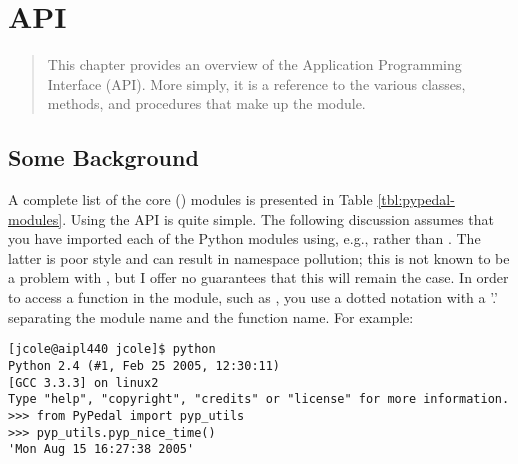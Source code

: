 \chapter{API}
\label{cha:api}
\begin{quote}
This chapter provides an overview of the \PYPEDAL{} Application Programming Interface (API).  More simply, it is a reference to the various classes, methods, and procedures that make up the \PYPEDAL{} module.
\end{quote}
\section{Some Background}
A complete list of the core \PyPedal() modules is presented in Table \ref{tbl:pypedal-modules}.  Using the \PyPedal{} API is quite simple.  The following discussion assumes that you have imported each of the Python modules using, e.g.,   rather than .  The latter is poor style and can result in namespace pollution; this is not known to be a problem with \PyPedal{}, but I offer no guarantees that this will remain the case.  In order to access a function in the  module, such as , you use a dotted notation with a '.' separating the module name and the function name.  For example:
\begin{verbatim}
[jcole@aipl440 jcole]$ python
Python 2.4 (#1, Feb 25 2005, 12:30:11)
[GCC 3.3.3] on linux2
Type "help", "copyright", "credits" or "license" for more information.
>>> from PyPedal import pyp_utils
>>> pyp_utils.pyp_nice_time()
'Mon Aug 15 16:27:38 2005'
\end{verbatim}
